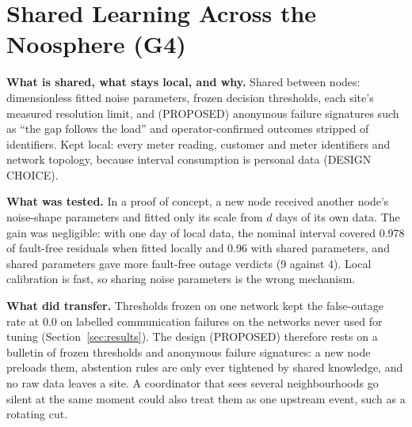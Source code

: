 \section{Shared Learning Across the Noosphere (G4)}\label{sec:shared}
\textbf{What is shared, what stays local, and why.} Shared between nodes: dimensionless fitted noise
parameters, frozen decision thresholds, each site's measured resolution limit, and (PROPOSED)
anonymous failure signatures such as ``the gap follows the load'' and operator-confirmed outcomes
stripped of identifiers. Kept local: every meter reading, customer and meter identifiers and network
topology, because interval consumption is personal data (DESIGN CHOICE).

\textbf{What was tested.} In a proof of concept, a new node received another node's noise-shape
parameters and fitted only its scale from $d$ days of its own data. The gain was negligible: with one
day of local data, the nominal interval covered 0.978 of fault-free residuals when fitted locally and
0.96 with shared parameters, and shared parameters gave more fault-free outage verdicts (9 against 4).
Local calibration is fast, so sharing noise parameters is the wrong mechanism.

\textbf{What did transfer.} Thresholds frozen on one network kept the false-outage rate at 0.0 on labelled communication failures on the
networks never used for tuning (Section~\ref{sec:results}). The design (PROPOSED) therefore rests on a
bulletin of frozen thresholds and anonymous failure signatures: a new node preloads them, abstention
rules are only ever tightened by shared knowledge, and no raw data leaves a site. A coordinator that
sees several neighbourhoods go silent at the same moment could also treat them as one upstream event,
such as a rotating cut.
